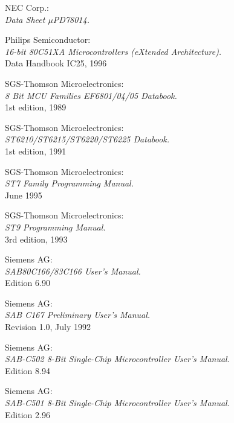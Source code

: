  NEC Corp.: \\
                  {\em Data Sheet $\mu$PD78014.\/}

 Philips Semiconductor: \\
                 {\em 16-bit 80C51XA Microcontrollers (eXtended
                  Architecture).\/} \\
                 Data Handbook IC25, 1996

 SGS-Thomson Microelectronics: \\
                {\em 8 Bit MCU Families EF6801/04/05 Databook.\/}\\
                1st edition, 1989

 SGS-Thomson Microelectronics: \\
                {\em ST6210/ST6215/ST6220/ST6225 Databook.\/} \\
                1st edition, 1991

 SGS-Thomson Microelectronics: \\
                 {\em ST7 Family Programming Manual.\/} \\
                 June 1995

 SGS-Thomson Microelectronics: \\
               {\em ST9 Programming Manual.\/} \\
               3rd edition, 1993

 Siemens AG: \\
                  {\em SAB80C166/83C166 User's Manual.\/} \\
                  Edition 6.90

 Siemens AG: \\
                  {\em SAB C167 Preliminary User's Manual.\/} \\
                  Revision 1.0, July 1992

 Siemens AG: \\
                  {\em SAB-C502 8-Bit Single-Chip Microcontroller User's
                   Manual.\/} \\
                  Edition 8.94

 Siemens AG: \\
                  {\em SAB-C501 8-Bit Single-Chip Microcontroller User's
                   Manual.\/} \\
                  Edition 2.96

